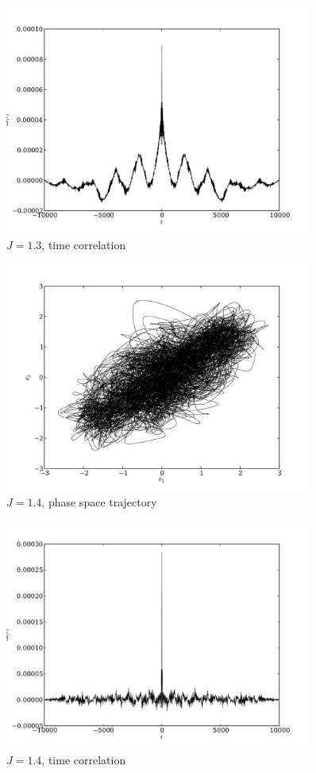 \documentclass{article} %
\begin{document}
\begin{figure}[p]
	\centering
	\includegraphics[width=0.9\textwidth]{paul_figs/tcorr_J_1_3}
	\caption{$J=1.3$, time correlation}
\end{figure}
\begin{figure}[p]
	\centering
	\includegraphics[width=0.9\textwidth]{paul_figs/J_1_4}
	\caption{$J=1.4$, phase space trajectory}
\end{figure}
\begin{figure}[p]
	\centering
	\includegraphics[width=0.9\textwidth]{paul_figs/tcorr_J_1_4}
	\caption{$J=1.4$, time correlation}
	\label{fig:last_pstcorr}
\end{figure}
\end{document}
